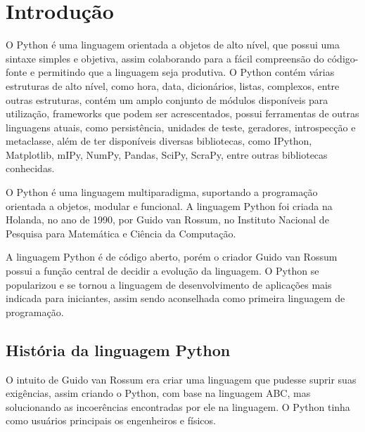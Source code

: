 


\chapter{ Introdução}

O Python é uma linguagem orientada a objetos de alto nível, que possui uma sintaxe simples e objetiva, assim colaborando para a fácil compreensão do código-fonte e permitindo que a linguagem seja produtiva. O Python contém várias estruturas de alto nível, como hora, data, dicionários, listas, complexos, entre outras estruturas, contém um amplo conjunto de módulos disponíveis para utilização, frameworks que podem ser acrescentados, possui ferramentas de outras linguagens atuais, como persistência, unidades de teste, geradores, introspecção e metaclasse, além de ter disponíveis diversas bibliotecas, como IPython, Matplotlib, mIPy, NumPy, Pandas, SciPy, ScraPy, entre outras bibliotecas conhecidas.

O Python é uma linguagem multiparadigma, suportando a programação orientada a objetos, modular e funcional. A linguagem Python foi criada na Holanda, no ano de 1990, por Guido van Rossum, no Instituto Nacional de Pesquisa para Matemática e Ciência da Computação. \cite{Borges2014}

A linguagem Python é de código aberto, porém o criador Guido van Rossum possui a função central de decidir a evolução da linguagem. O Python se popularizou e se tornou a linguagem de desenvolvimento de aplicações mais indicada para iniciantes, assim sendo aconselhada como primeira linguagem de programação. \cite{Perkovic2016}




\section{História da linguagem Python}

O intuito de Guido van Rossum era criar uma linguagem que pudesse suprir suas exigências, assim criando o Python, com base na linguagem ABC, mas solucionando as incoerências encontradas por ele na linguagem. O Python tinha como usuários principais os engenheiros e físicos.



